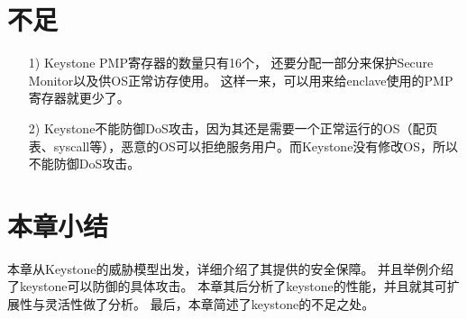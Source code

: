 \section{不足}
\begin{itemize}
	\item [1)]
	Keystone PMP寄存器的数量只有16个，
	还要分配一部分来保护Secure Monitor以及供OS正常访存使用。
	这样一来，可以用来给enclave使用的PMP寄存器就更少了。
	\item [2)]
	Keystone不能防御DoS攻击，因为其还是需要一个正常运行的OS（配页表、syscall等），恶意的OS可以拒绝服务用户。而Keystone没有修改OS，所以不能防御DoS攻击。
\end{itemize}

\section{本章小结}
本章从Keystone的威胁模型出发，详细介绍了其提供的安全保障。
并且举例介绍了keystone可以防御的具体攻击。
本章其后分析了keystone的性能，并且就其可扩展性与灵活性做了分析。
最后，本章简述了keystone的不足之处。
